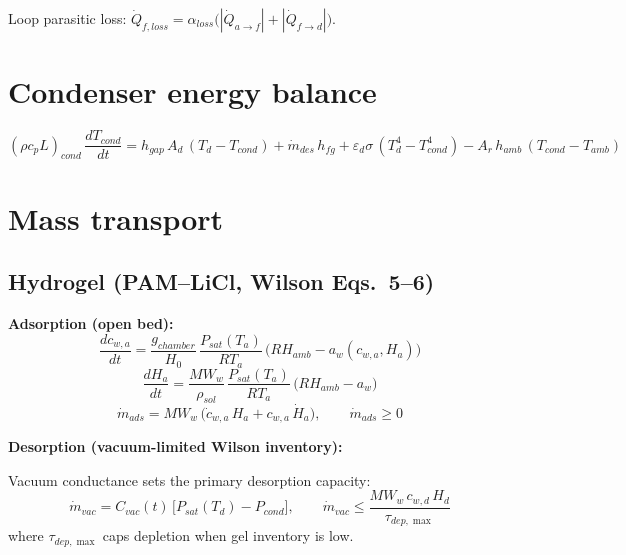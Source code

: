 \documentclass[11pt]{article}
\begin{document}
Loop parasitic loss: $\dot{Q}_{f,loss} = \alpha_{loss}\bigl(|\dot{Q}_{a\to f}| + |\dot{Q}_{f\to d}|\bigr)$.

\section{Condenser energy balance}

\begin{equation}
(\rho c_p L)_{cond}\,\frac{dT_{cond}}{dt}
= h_{gap}\,A_d\,(T_d - T_{cond})
+ \dot{m}_{des}\,h_{fg}
+ \varepsilon_d\sigma\,(T_d^4 - T_{cond}^4)
- A_r\,h_{amb}\,(T_{cond} - T_{amb})
\label{eq:condenser}
\end{equation}

\section{Mass transport}

\subsection{Hydrogel (PAM--LiCl, Wilson Eqs.~5--6)}

\textbf{Adsorption (open bed):}
\begin{equation}
\frac{dc_{w,a}}{dt} = \frac{g_{chamber}}{H_0}\,\frac{P_{sat}(T_a)}{RT_a}\,\bigl(RH_{amb} - a_w(c_{w,a}, H_a)\bigr)
\label{eq:massads}
\end{equation}
\begin{equation}
\frac{dH_a}{dt} = \frac{MW_w}{\rho_{sol}}\,\frac{P_{sat}(T_a)}{RT_a}\,\bigl(RH_{amb} - a_w\bigr)
\end{equation}
\begin{equation}
\dot{m}_{ads} = MW_w\,\bigl(\dot{c}_{w,a}\,H_a + c_{w,a}\,\dot{H}_a\bigr), \qquad \dot{m}_{ads} \ge 0
\end{equation}

\textbf{Desorption (vacuum-limited Wilson inventory):}

Vacuum conductance sets the primary desorption capacity:
\begin{equation}
\dot{m}_{vac} = C_{vac}(t)\,\bigl[P_{sat}(T_d) - P_{cond}\bigr],
\qquad
\dot{m}_{vac} \le \frac{MW_w\,c_{w,d}\,H_d}{\tau_{dep,\max}}
\label{eq:massdes}
\end{equation}
where $\tau_{dep,\max}$ caps depletion when gel inventory is low.
\end{document}
